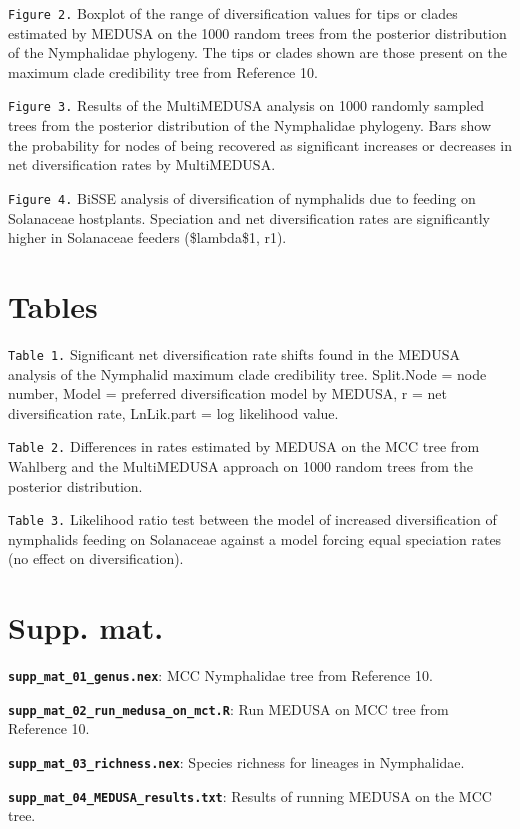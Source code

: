 \documentclass[10pt]{article}
\begin{document}
\texttt{Figure 2.} Boxplot of the range of diversification values for
tips or clades estimated by MEDUSA on the 1000 random trees from the
posterior distribution of the Nymphalidae phylogeny. The tips or clades
shown are those present on the maximum clade credibility tree from
Reference 10.

\texttt{Figure 3.} Results of the MultiMEDUSA analysis on 1000 randomly
sampled trees from the posterior distribution of the Nymphalidae
phylogeny. Bars show the probability for nodes of being recovered as
significant increases or decreases in net diversification rates by
MultiMEDUSA.

\texttt{Figure 4.} BiSSE analysis of diversification of nymphalids due
to feeding on Solanaceae hostplants. Speciation and net diversification
rates are significantly higher in Solanaceae feeders (\$lambda\$1, r1).

\section*{Tables}

\texttt{Table 1.} Significant net diversification rate shifts found in
the MEDUSA analysis of the Nymphalid maximum clade credibility tree.
Split.Node = node number, Model = preferred diversification model by
MEDUSA, r = net diversification rate, LnLik.part = log likelihood value.

\texttt{Table 2.} Differences in rates estimated by MEDUSA on the MCC
tree from Wahlberg and the MultiMEDUSA approach on 1000 random trees
from the posterior distribution.

\texttt{Table 3.} Likelihood ratio test between the model of increased
diversification of nymphalids feeding on Solanaceae against a model
forcing equal speciation rates (no effect on diversification).

\section*{Supp. mat.}

\textbf{\texttt{supp\_mat\_01\_genus.nex}}: MCC Nymphalidae tree from
Reference 10.

\textbf{\texttt{supp\_mat\_02\_run\_medusa\_on\_mct.R}}: Run MEDUSA on
MCC tree from Reference 10.

\textbf{\texttt{supp\_mat\_03\_richness.nex}}: Species richness for
lineages in Nymphalidae.

\textbf{\texttt{supp\_mat\_04\_MEDUSA\_results.txt}}: Results of running
MEDUSA on the MCC tree.
\end{document}
